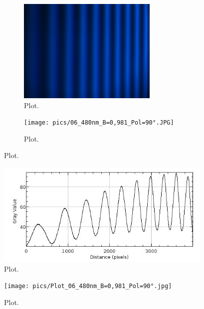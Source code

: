 \begin{figure}[h!]
 \begin{subfigure}{0.48\textwidth}
  \centering
  \includegraphics[height=5cm]{pics/04_480nm_B=0.JPG}
  \caption{Plot.}
  \label{fig:plot}
 \end{subfigure}
 \begin{subfigure}{0.48\textwidth}
  \centering
  \texttt{[image: pics/06\_480nm\_B=0,981\_Pol=90°.JPG]}
  \caption{Plot.}
  \label{fig:plot}
 \end{subfigure}
\end{figure}

\begin{figure}[h!]
  \centering
  \includegraphics[height=5cm]{pics/Plot_480nm_B=0.jpg}
  \caption{Plot.}
  \label{fig:p5}
\end{figure}
\begin{figure}[h!]
  \centering
  \texttt{[image: pics/Plot\_06\_480nm\_B=0,981\_Pol=90°.jpg]}
  \caption{Plot.}
  \label{fig:p6}
\end{figure}

